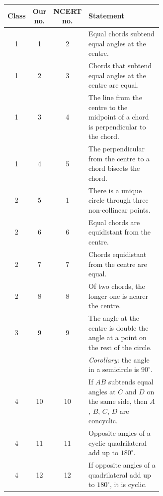 \documentclass[11pt,a4paper]{article}
\theoremstyle{branddef}
\begin{document}
\begin{center}
\renewcommand{\arraystretch}{1.25}
\begin{tabular}{|c|c|c|p{0.62\linewidth}|}\hline
\textbf{Class} & \textbf{Our no.} & \textbf{NCERT no.} & \textbf{Statement}\\ \hline
1 & 1 & 2 & Equal chords subtend equal angles at the centre.\\ \hline
1 & 2 & 3 & Chords that subtend equal angles at the centre are equal.\\ \hline
1 & 3 & 4 & The line from the centre to the midpoint of a chord is perpendicular to the chord.\\ \hline
1 & 4 & 5 & The perpendicular from the centre to a chord bisects the chord.\\ \hline
2 & 5 & 1 & There is a unique circle through three non-collinear points.\\ \hline
2 & 6 & 6 & Equal chords are equidistant from the centre.\\ \hline
2 & 7 & 7 & Chords equidistant from the centre are equal.\\ \hline
2 & 8 & 8 & Of two chords, the longer one is nearer the centre.\\ \hline
3 & 9 & 9 & The angle at the centre is double the angle at a point on the rest of the circle.\\
 & & & \emph{Corollary:} the angle in a semicircle is $90^\circ$.\\ \hline
4 & 10 & 10 & If $AB$ subtends equal angles at $C$ and $D$ on the same side, then $A$, $B$, $C$, $D$ are concyclic.\\ \hline
4 & 11 & 11 & Opposite angles of a cyclic quadrilateral add up to $180^\circ$.\\ \hline
4 & 12 & 12 & If opposite angles of a quadrilateral add up to $180^\circ$, it is cyclic.\\ \hline
\end{tabular}
\end{center}
\end{document}
